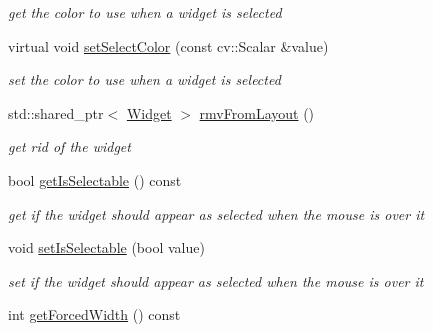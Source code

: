 \begin{DoxyCompactItemize}
\begin{DoxyCompactList}\small\item\em get the color to use when a widget is selected \end{DoxyCompactList}\item 
virtual void \hyperlink{classcanvascv_1_1Widget_a64e1123175981fca5219519fac987596}{set\+Select\+Color} (const cv\+::\+Scalar \&value)\hypertarget{classcanvascv_1_1Widget_a64e1123175981fca5219519fac987596}{}\label{classcanvascv_1_1Widget_a64e1123175981fca5219519fac987596}

\begin{DoxyCompactList}\small\item\em set the color to use when a widget is selected \end{DoxyCompactList}\item 
std\+::shared\+\_\+ptr$<$ \hyperlink{classcanvascv_1_1Widget}{Widget} $>$ \hyperlink{classcanvascv_1_1Widget_ac3f34f3b8b3b57f000e5f5182d6396ab}{rmv\+From\+Layout} ()\hypertarget{classcanvascv_1_1Widget_ac3f34f3b8b3b57f000e5f5182d6396ab}{}\label{classcanvascv_1_1Widget_ac3f34f3b8b3b57f000e5f5182d6396ab}

\begin{DoxyCompactList}\small\item\em get rid of the widget \end{DoxyCompactList}\item 
bool \hyperlink{classcanvascv_1_1Widget_a7a2e233c96587b142c6c937cc3bdeaa4}{get\+Is\+Selectable} () const \hypertarget{classcanvascv_1_1Widget_a7a2e233c96587b142c6c937cc3bdeaa4}{}\label{classcanvascv_1_1Widget_a7a2e233c96587b142c6c937cc3bdeaa4}

\begin{DoxyCompactList}\small\item\em get if the widget should appear as selected when the mouse is over it \end{DoxyCompactList}\item 
void \hyperlink{classcanvascv_1_1Widget_a2d873d23e3f7f07d2ea1a487ea4665e9}{set\+Is\+Selectable} (bool value)\hypertarget{classcanvascv_1_1Widget_a2d873d23e3f7f07d2ea1a487ea4665e9}{}\label{classcanvascv_1_1Widget_a2d873d23e3f7f07d2ea1a487ea4665e9}

\begin{DoxyCompactList}\small\item\em set if the widget should appear as selected when the mouse is over it \end{DoxyCompactList}\item 
int \hyperlink{classcanvascv_1_1Widget_a97720a3b8073edecd43fe32ad1ce4f93}{get\+Forced\+Width} () const \hypertarget{classcanvascv_1_1Widget_a97720a3b8073edecd43fe32ad1ce4f93}{}\label{classcanvascv_1_1Widget_a97720a3b8073edecd43fe32ad1ce4f93}


\end{DoxyCompactItemize}
